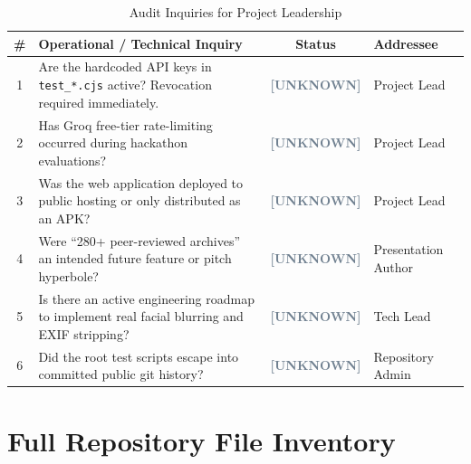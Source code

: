 \documentclass[10pt,a4paper]{report}
\newcommand{\unknown}{\colorbox{gray!20}{\textcolor{slateGray}{\bfseries\scriptsize [UNKNOWN]}}}
\begin{document}
\begin{table}[htbp]
\centering
\small
\caption{Audit Inquiries for Project Leadership}
\begin{tabularx}{\textwidth}{c X c l}
\toprule
\textbf{\#} & \textbf{Operational / Technical Inquiry} & \textbf{Status} & \textbf{Addressee} \\
\midrule
1 & Are the hardcoded API keys in \texttt{test\_*.cjs} active? Revocation required immediately. & \unknown & Project Lead \\
2 & Has Groq free-tier rate-limiting occurred during hackathon evaluations? & \unknown & Project Lead \\
3 & Was the web application deployed to public hosting or only distributed as an APK? & \unknown & Project Lead \\
4 & Were ``280+ peer-reviewed archives'' an intended future feature or pitch hyperbole? & \unknown & Presentation Author \\
5 & Is there an active engineering roadmap to implement real facial blurring and EXIF stripping? & \unknown & Tech Lead \\
6 & Did the root test scripts escape into committed public git history? & \unknown & Repository Admin \\
\bottomrule
\end{tabularx}
\end{table}

\appendix

\chapter{Full Repository File Inventory}
\end{document}
